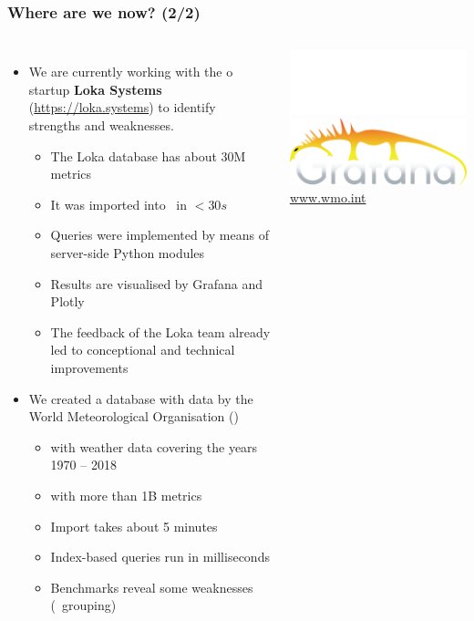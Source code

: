 \documentclass[mathserif,usenames,dvipsnames]{beamer}
\begin{document}
\begin{frame}[shrink]
\frametitle{Where are we now? (2/2)}
\begin{columns}[T]
\begin{itemize}
\item We are currently working with the o
      startup \textbf{Loka Systems} (\url{https://loka.systems})
      to identify strengths and weaknesses.
      \begin{itemize}
      \item The Loka database has about 30M metrics
      \item It was imported into \nowdb\ in $< 30s$
      \item Queries were implemented by means of\\
            server-side Python modules
      \item Results are visualised by Grafana and Plotly
      \item The feedback of the Loka team already led
            to conceptional and technical improvements
      \end{itemize}
\item We created a database with data
      by the World Meteorological Organisation
      ()
      \begin{itemize}
      \item with weather data covering the years 1970 -- 2018
      \item with more than 1B metrics
      \item Import takes about 5 minutes
      \item Index-based queries run in milliseconds
      \item Benchmarks reveal some weaknesses \\
            (\eg\ grouping)
      \end{itemize}
\end{itemize}
\begin{center}
\linewidth
\includegraphics[width=0.85\linewidth]{lokalogo.png}
\vskip0.85cm
\linewidth
\includegraphics[width=0.85\linewidth]{grafanalogo.png}
\vskip1.0cm
\linewidth
{\color{MidnightBlue} \url{www.wmo.int}}
\end{center}
\end{columns}
\end{frame}
\end{document}
